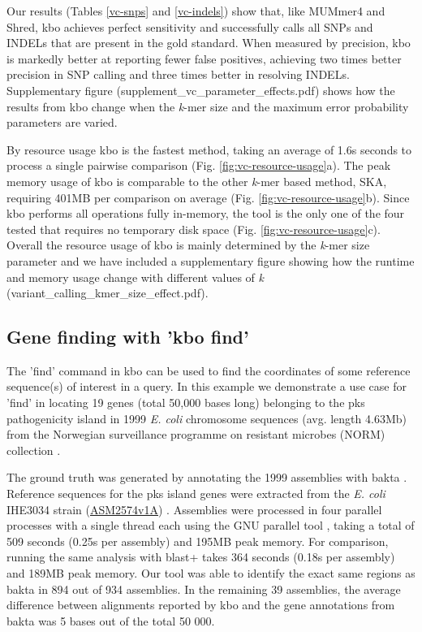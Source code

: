 \documentclass[unnumsec,webpdf,contemporary,large]{oup-authoring-template}%
\theoremstyle{thmstyleone}%
\theoremstyle{thmstyletwo}%
\theoremstyle{thmstylethree}%
\begin{document}
Our results (Tables \ref{vc-snps} and \ref{vc-indels}) show that, like MUMmer4 and Shred, {\sf kbo} achieves perfect sensitivity and successfully calls all SNPs and INDELs that are present in the gold standard. When measured by precision, {\sf kbo} is markedly better at reporting fewer false positives, achieving two times better precision in SNP calling and three times better in resolving INDELs. Supplementary figure (supplement\_vc\_parameter\_effects.pdf) shows how the results from {\sf kbo} change when the \emph{k}-mer size and the maximum error probability parameters are varied.

By resource usage {\sf kbo} is the fastest method, taking an average of 1.6s seconds to process a single pairwise comparison (Fig. \ref{fig:vc-resource-usage}a). The peak memory usage of {\sf kbo} is comparable to the other \emph{k}-mer based method, SKA, requiring 401MB per comparison on average (Fig. \ref{fig:vc-resource-usage}b). Since {\sf kbo} performs all operations fully in-memory, the tool is the only one of the four tested that requires no temporary disk space (Fig. \ref{fig:vc-resource-usage}c). Overall the resource usage of {\sf kbo} is mainly determined by the \emph{k}-mer size parameter and we have included a supplementary figure showing how the runtime and memory usage change with different values of \emph{k} (variant\_calling\_kmer\_size\_effect.pdf).

\subsection{Gene finding with 'kbo find'}
The 'find' command in {\sf kbo} can be used to find the coordinates of some reference sequence(s) of interest in a query. In this example we demonstrate a use case for 'find' in locating 19 genes (total 50,000 bases long) belonging to the pks pathogenicity island in 1999 \textit{E. coli} chromosome sequences (avg. length 4.63Mb) from the Norwegian surveillance programme on resistant microbes (NORM) collection \cite{gladstone2021emergence, arredondo2023escherichia}.

The ground truth was generated by annotating the 1999 assemblies with bakta \cite{schwengers2021bakta}. Reference sequences for the pks island genes were extracted from the \textit{E. coli} IHE3034 strain (\href{https://www.ebi.ac.uk/ena/browser/view/GCA_000025745.1}{ASM2574v1A}) \cite{moriel2010identification}. Assemblies were processed in four parallel processes with a single thread each using the GNU parallel tool \cite{tange_2024_13826092}, taking a total of 509 seconds (0.25s per assembly) and 195MB peak memory. For comparison, running the same analysis with blast+ \cite{camacho2009blast+} takes 364 seconds (0.18s per assembly) and 189MB peak memory. Our tool was able to identify the exact same regions as bakta in 894 out of 934 assemblies. In the remaining 39 assemblies, the average difference between alignments reported by {\sf kbo} and the gene annotations from bakta was 5 bases out of the total 50 000.
\end{document}
